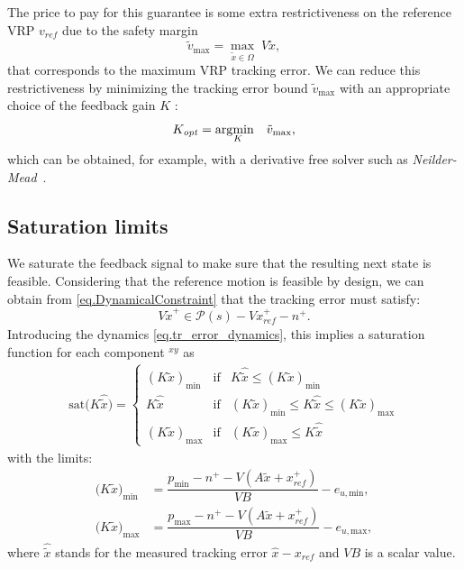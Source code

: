 \documentclass[letterpaper, 10 pt, conference]{ieeeconf}  %
\begin{document}
The price to pay for this guarantee is some extra restrictiveness on the reference VRP $ v_\mathit{ref} $ due to the safety margin
%
\begin{equation}
    \tilde{v}_\mathrm{max} = \max_{\tilde{x}\in\Omega} \; V \tilde{x},
\end{equation}
%
that corresponds to the maximum VRP tracking error. We can reduce this restrictiveness by minimizing the tracking error bound $\tilde{v}_\mathrm{max}$ with an appropriate choice of the feedback gain $K$ \cite[Chapter 4.5]{Villa2019managing}:
\begin{equation}\label{eq.OptimalGain}
K_\mathit{opt} = \arg\!\min_{\hspace*{-3mm}K} \;\;\;\tilde{v}_\mathrm{max},
\end{equation}
which can be obtained, for example, with a derivative free solver such as \textit{Neilder-Mead}~\cite{Gao_2012_Neilder-Mead}.

\subsection{Saturation limits}\label{sec.AboutSaturation}

We saturate the feedback signal to make sure that the resulting next state is feasible. Considering that the reference motion is feasible by design, we can obtain from \eqref{eq.DynamicalConstraint} that the tracking error must satisfy:
%
\begin{equation}
    V\tilde{x}^+ \in \mathcal{P}(s) - Vx_\mathit{ref}^+ - n^+.
\end{equation}
%
Introducing the dynamics \eqref{eq.tr_error_dynamics}, this implies a saturation function for each component $^{xy}$ as
%
\begin{align}
\mathrm{sat}\big(K\hat{\tilde{x}}\big) \!=
\!\left\{
        \!\!\begin{array}{lll}
            {(K\tilde{x})}_\mathrm{min} & \mathrm{if} &  K\hat{\tilde{x}} \leq {(K\tilde{x})}_\mathrm{min} \\
            K\hat{\tilde{x}} & \mathrm{if}& {(K\tilde{x})}_\mathrm{min} \leq K\hat{\tilde{x}} \leq {(K\tilde{x})}_\mathrm{max} \\
            {(K\tilde{x})}_\mathrm{max} & \mathrm{if} & {(K\tilde{x})}_\mathrm{max} \leq K\hat{\tilde{x}}
        \end{array}
    \right.
\end{align}
%
with the limits:
%
\begin{align}
    ({K\tilde{x})}_\mathrm{min} &= \dfrac{p^{ }_\mathrm{min}-n^+ - V\!(A\tilde{x}+x_\mathit{ref}^+)}{V\!B} - e_{\mathit{u},\mathrm{min}},\\
    ({K\tilde{x})}_\mathrm{max} &= \dfrac{p^{ }_\mathrm{max}-n^+ - V\!(A\tilde{x}+x_\mathit{ref}^+)}{V\!B} - e_{\mathit{u},\mathrm{max}},
\end{align}
%
where $\hat{\tilde{x}}$ stands for the measured tracking error $ \hat{x} - x_\mathit{ref} $ and $V\!B$ is a scalar value.
\end{document}
